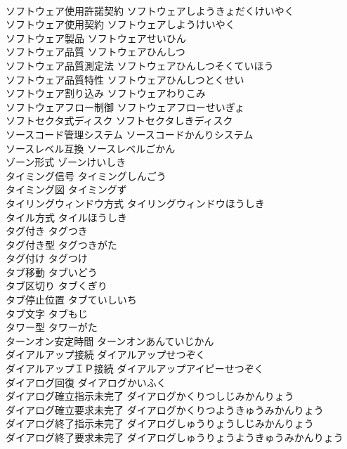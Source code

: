 \documentclass[8pt]{extreport}
\begin{document}
\begin{CJK}{UTF8}{min}
\\	ソフトウェア使用許諾契約	ソフトウェアしようきょだくけいやく	
\\	ソフトウェア使用契約	ソフトウェアしようけいやく	
\\	ソフトウェア製品	ソフトウェアせいひん	
\\	ソフトウェア品質	ソフトウェアひんしつ	
\\	ソフトウェア品質測定法	ソフトウェアひんしつそくていほう	
\\	ソフトウェア品質特性	ソフトウェアひんしつとくせい	
\\	ソフトウェア割り込み	ソフトウェアわりこみ	
\\	ソフトウェアフロー制御	ソフトウェアフローせいぎょ	
\\	ソフトセクタ式ディスク	ソフトセクタしきディスク	
\\	ソースコード管理システム	ソースコードかんりシステム	
\\	ソースレベル互換	ソースレベルごかん	
\\	ゾーン形式	ゾーンけいしき	
\\	タイミング信号	タイミングしんごう	
\\	タイミング図	タイミングず	
\\	タイリングウィンドウ方式	タイリングウィンドウほうしき	
\\	タイル方式	タイルほうしき	
\\	タグ付き	タグつき	
\\	タグ付き型	タグつきがた	
\\	タグ付け	タグつけ	
\\	タブ移動	タブいどう	
\\	タブ区切り	タブくぎり	
\\	タブ停止位置	タブていしいち	
\\	タブ文字	タブもじ	
\\	タワー型	タワーがた	
\\	ターンオン安定時間	ターンオンあんていじかん	
\\	ダイアルアップ接続	ダイアルアップせつぞく	
\\	ダイアルアップＩＰ接続	ダイアルアップアイピーせつぞく	
\\	ダイアログ回復	ダイアログかいふく	
\\	ダイアログ確立指示未完了	ダイアログかくりつしじみかんりょう	
\\	ダイアログ確立要求未完了	ダイアログかくりつようきゅうみかんりょう	
\\	ダイアログ終了指示未完了	ダイアログしゅうりょうしじみかんりょう	
\\	ダイアログ終了要求未完了	ダイアログしゅうりょうようきゅうみかんりょう	

\end{CJK}
\end{document}
